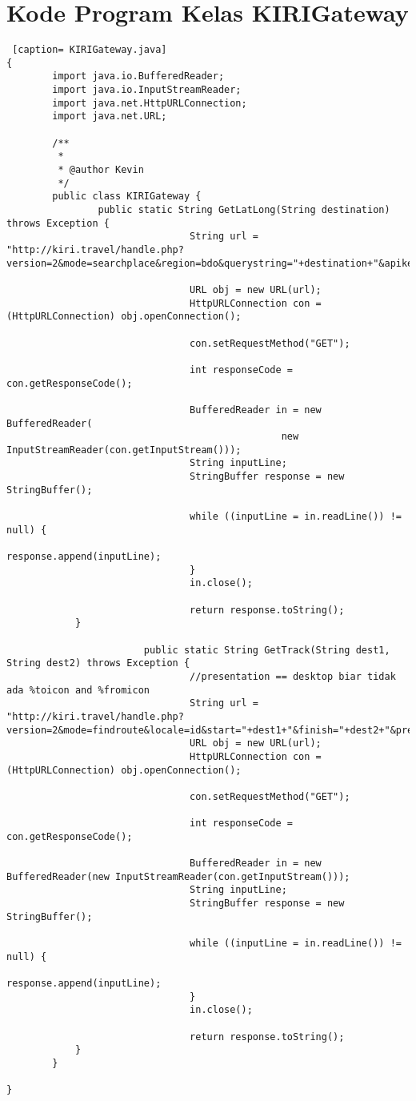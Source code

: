 \chapter{Kode Program Kelas KIRIGateway}
\label{Kode Program Kelas KIRIGateway}

\begin{lstlisting} [caption= KIRIGateway.java]
{ 
		import java.io.BufferedReader;
		import java.io.InputStreamReader;
		import java.net.HttpURLConnection;
		import java.net.URL;

		/**
		 *
		 * @author Kevin
		 */
		public class KIRIGateway {
				public static String GetLatLong(String destination) throws Exception {
								String url = "http://kiri.travel/handle.php?version=2&mode=searchplace&region=bdo&querystring="+destination+"&apikey=889C2C8FBB82C7E6";

								URL obj = new URL(url);
								HttpURLConnection con = (HttpURLConnection) obj.openConnection();

								con.setRequestMethod("GET");

								int responseCode = con.getResponseCode();

								BufferedReader in = new BufferedReader(
												new InputStreamReader(con.getInputStream()));
								String inputLine;
								StringBuffer response = new StringBuffer();

								while ((inputLine = in.readLine()) != null) {
												response.append(inputLine);
								}
								in.close();

								return response.toString();
			}
						
						public static String GetTrack(String dest1, String dest2) throws Exception {
								//presentation == desktop biar tidak ada %toicon and %fromicon
								String url = "http://kiri.travel/handle.php?version=2&mode=findroute&locale=id&start="+dest1+"&finish="+dest2+"&presentation=desktop&apikey=889C2C8FBB82C7E6";
								URL obj = new URL(url);
								HttpURLConnection con = (HttpURLConnection) obj.openConnection();

								con.setRequestMethod("GET");

								int responseCode = con.getResponseCode();

								BufferedReader in = new BufferedReader(new InputStreamReader(con.getInputStream()));
								String inputLine;
								StringBuffer response = new StringBuffer();

								while ((inputLine = in.readLine()) != null) {
												response.append(inputLine);
								}
								in.close();

								return response.toString();
			}
		}

}
\end{lstlisting}